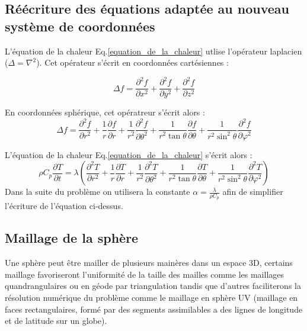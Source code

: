 \documentclass[fleqn]{article}
\begin{document}
\subsection{Réécriture des équations adaptée au nouveau système de coordonnées}
 
L'équation de la chaleur Eq.\eqref{equation_de_la_chaleur} utlise l'opérateur laplacien ($\Delta = \nabla^2$). Cet opérateur s'écrit en coordonnées cartésiennes :

\begin{equation}
    \Delta f = {\frac {\partial ^{2}f }{\partial x^{2}}}+{\frac {\partial ^{2}f }{\partial y^{2}}}+{\frac {\partial ^{2}f }{\partial z^{2}}}
\end{equation}

En coordonnées sphérique, cet opératreur s'écrit alors :
\begin{equation}
     \Delta f={\frac {\partial ^{2}f}{\partial r^{2}}}+{\frac {1}{r}}{\frac {\partial f}{\partial r}}+{\frac {1}{r^{2}}}{\frac {\partial ^{2}f}{\partial \theta ^{2}}}+{\frac {1}{r^{2}\tan \theta }}{\frac {\partial f}{\partial \theta }}+{\frac {1}{r^{2}\sin ^{2}\theta }}{\frac {\partial ^{2}f}{\partial \varphi ^{2}}}
\end{equation}

L'équation de la chaleur Eq.\eqref{equation_de_la_chaleur} s'écrit alors :
\begin{equation}
    \rho C_p \frac{ \partial T}{\partial t}  = \lambda \left( 
    {\frac {\partial ^{2}T}{\partial r^{2}}}+{\frac {1}{r}}{\frac {\partial T}{\partial r}}+{\frac {1}{r^{2}}}{\frac {\partial ^{2}T}{\partial \theta ^{2}}}+{\frac {1}{r^{2}\tan \theta }}{\frac {\partial T}{\partial \theta }}+{\frac {1}{r^{2}\sin ^{2}\theta }}{\frac {\partial ^{2}T}{\partial \varphi ^{2}}} \right)      
\end{equation}
Dans la suite du problème on utilisera la constante $\alpha = \frac{\lambda}{\rho C_p}$ afin de simplifier l'écriture de l'équation ci-dessus.

\subsection{Maillage de la sphère}
Une sphère peut être mailler de plusieurs mainères dans un espace 3D, certains maillage favoriseront l'uniformité de la taille des mailles comme les maillages quandrangulaires ou en géode par triangulation tandis que d'autres faciliterons la résolution numérique du problème comme le maillage en sphère UV (maillage en faces rectangulaires, formé par des segments assimilables a des lignes de longitude et de latitude sur un globe).
\end{document}
